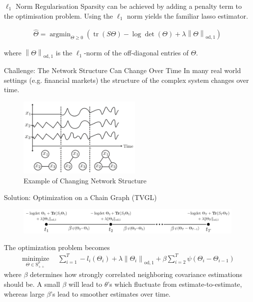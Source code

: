 \documentclass{beamer}
\begin{document}
\begin{frame}{$\ell_1$ Norm Regularisation}
Sparsity can be achieved by adding a penalty term to the optimisation problem. Using the $\ell_1$ norm yields the familiar lasso estimator.

\begin{align*}
    \hat{\Theta}=\operatorname{argmin}_{\Theta \geq 0}\left(\operatorname{tr}(S \Theta)-\log \operatorname{det}(\Theta)+\lambda\left\|\Theta \right\|_{\mathrm{od}, 1}\right)
\end{align*}

where $\left\|\Theta \right\|_{\mathrm{od}, 1}$ is the $\ell_1$-norm of the off-diagonal entries of $\Theta$.

\end{frame}


\begin{frame}{Challenge: The Network Structure Can Change Over Time}
    In many real world settings (e.g. financial markets) the structure of the complex system changes over time.
    \begin{figure}
       \includegraphics[width=6cm]{network_evolution}
       \caption{Example of Changing Network Structure \cite{hallac2017network}}
       \label{fig:network_evolution}
  \end{figure}
\end{frame}

\begin{frame}{Solution: Optimization on a Chain Graph (TVGL)}
    \begin{figure}
       \includegraphics[width=12cm]{chain_graph.png}
       \caption{\cite{hallac2017network}}
       \label{fig:chain_graph}
  \end{figure}
    The optimization problem becomes
    \begin{align*}
        \underset{\Theta \in \mathrm{S}_{++}^{p}}{\operatorname{minimize}} \quad \sum_{i=1}^{T}-l_{i}\left(\Theta_{i}\right)+\lambda\left\|\Theta_{i}\right\|_{\mathrm{od}, 1}+\beta \sum_{i=2}^{T} \psi\left(\Theta_{i}-\Theta_{i-1}\right)
    \end{align*}
    where $\beta$ determines how strongly correlated neighboring covariance estimations should be.
    A small $\beta$ will lead to $\theta$'s which fluctuate from estimate-to-estimate, whereas large $\beta$'s lead to smoother estimates over time.
\end{frame}
\end{document}

